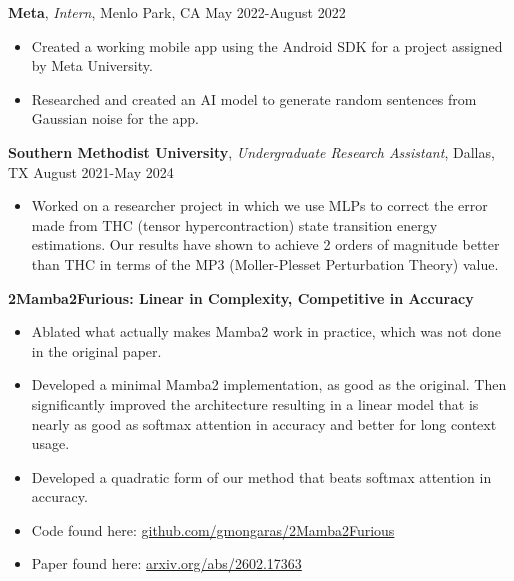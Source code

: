 \documentclass[a4paper,10pt]{article}
\begin{document}
\noindent\textbf{Meta}, \textit{Intern}, Menlo Park, CA \hfill May 2022-August 2022
\begin{itemize}[noitemsep,topsep=0pt]
  \item Created a working mobile app using the Android SDK for a project assigned by Meta University.
  \item Researched and created an AI model to generate random sentences from Gaussian noise for the app.
\end{itemize}

\noindent\textbf{Southern Methodist University}, \textit{Undergraduate Research Assistant}, Dallas, TX \hfill August 2021-May 2024
\begin{itemize}[noitemsep,topsep=0pt]
  \item Worked on a researcher project in which we use MLPs to correct the error made from THC (tensor hypercontraction) state transition energy estimations. Our results have shown to achieve 2 orders of magnitude better than THC in terms of the MP3 (Moller-Plesset Perturbation Theory) value.
\end{itemize}


\newpage



 \vspace{1pt}

\noindent\textbf{2Mamba2Furious: Linear in Complexity, Competitive in Accuracy}
\begin{itemize}[noitemsep,topsep=0pt]
  \item Ablated what actually makes Mamba2 work in practice, which was not done in the original paper.
  \item Developed a minimal Mamba2 implementation, as good as the original. Then significantly improved the architecture resulting in a linear model that is nearly as good as softmax attention in accuracy and better for long context usage.
  \item Developed a quadratic form of our method that beats softmax attention in accuracy.
  \item Code found here: \href{https://github.com/gmongaras/2Mamba2Furious}{github.com/gmongaras/2Mamba2Furious}
  \item Paper found here: \href{https://arxiv.org/abs/2602.17363}{arxiv.org/abs/2602.17363}
\end{itemize}
\end{document}
